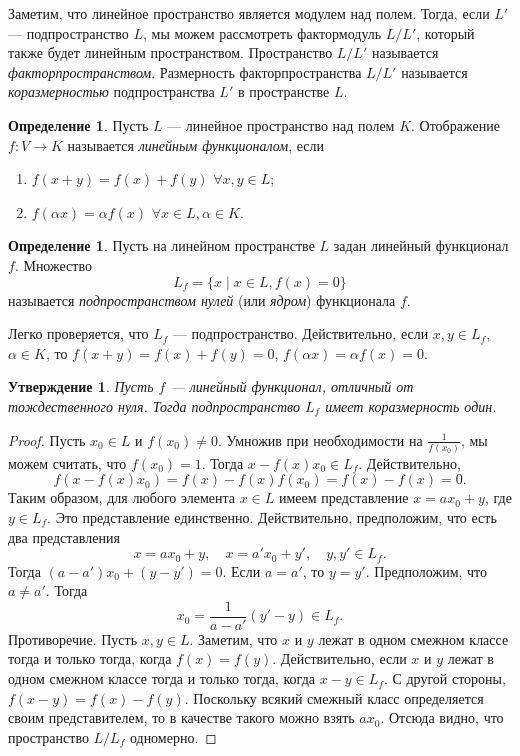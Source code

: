 \documentclass[12pt, titlepage, oneside]{amsbook}
\newtheorem{claim}[theorem]{Утверждение}
\theoremstyle{definition}
\newtheorem{definition}[theorem]{Определение}
\theoremstyle{remark}
\begin{document}
Заметим, что линейное пространство является модулем над полем. Тогда, если $L'$ --- подпространство $L$, мы можем рассмотреть фактормодуль $L/L'$, который также будет линейным пространством. Пространство $L/L'$ называется \emph{факторпространством}. Размерность факторпространства $L/L'$ называется \emph{коразмерностью} подпространства $L'$ в пространстве $L$.

\begin{definition}
	Пусть $L$ --- линейное пространство над полем $K$. Отображение $f\colon V\rightarrow K$ называется \emph{линейным функционалом}, если
	\begin{enumerate}
		\item $f(x+y)=f(x)+f(y)$ $\forall x,y\in L$;
		\item $f(\alpha x)=\alpha f(x)$ $\forall x\in L,\alpha\in K$.
	\end{enumerate}
\end{definition}

\begin{definition}
	Пусть на линейном пространстве $L$ задан линейный функционал $f$. Множество $$L_f=\{x\mid x\in L, f(x)=0\}$$ называется \emph{подпространством нулей} (или \emph{ядром}) функционала $f$.
\end{definition}

Легко проверяется, что $L_f$ --- подпространство. Действительно, если $x,y\in L_f$, $\alpha\in K$, то $f(x+y)=f(x)+f(y)=0$, $f(\alpha x)=\alpha f(x)=0$.

\begin{claim}
	\label{LP1}
	Пусть $f$ --- линейный функционал, отличный от тождественного нуля. Тогда подпространство $L_f$ имеет коразмерность один.
\end{claim}

\begin{proof}
	Пусть $x_0\in L$ и $f(x_0)\neq 0$. Умножив при необходимости на $\frac{1}{f(x_0)}$, мы можем считать, что $f(x_0)=1$. Тогда $x-f(x) x_0\in L_f$. Действительно, $$f(x-f(x) x_0)=f(x)-f(x)f(x_0)=f(x)-f(x)=0.$$ Таким образом, для любого элемента $x\in L$ имеем представление $x=ax_0+y$, где $y\in L_f$. Это представление единственно. Действительно, предположим, что есть два представления $$x=a x_0+y,\quad x=a' x_0+y',\quad y,y'\in L_f.$$ Тогда $(a-a')x_0+(y-y')=0$. Если $a=a'$, то $y=y'$. Предположим, что $a\neq a'$. Тогда $$x_0=\frac{1}{a-a'}(y'-y)\in L_f.$$ Противоречие. Пусть $x,y\in L$.  Заметим, что $x$ и $y$ лежат в одном смежном классе тогда и только тогда, когда $f(x)=f(y)$. Действительно, если $x$ и $y$ лежат в одном смежном классе тогда и только тогда, когда $x-y\in L_f$. С другой стороны, $f(x-y)=f(x)-f(y)$. Поскольку всякий смежный класс определяется своим представителем, то в качестве такого можно взять $a x_0$. Отсюда видно, что пространство $L/L_f$ одномерно.
\end{proof}
\end{document}
